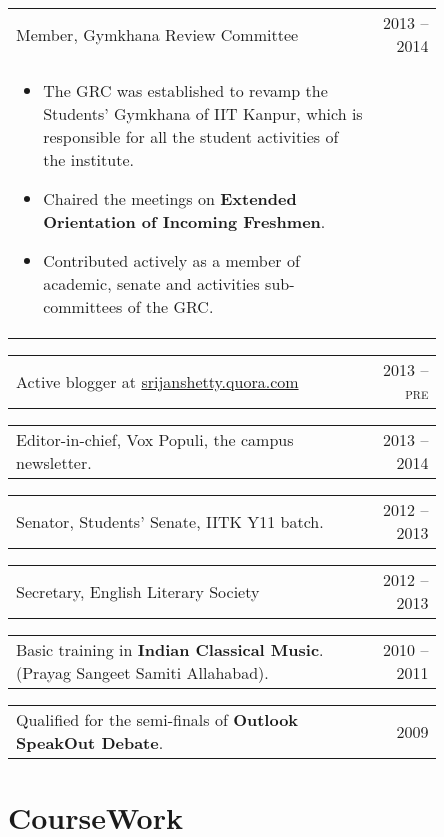 \documentclass[a4paper,10pt]{article} %
\newcommand{\projectlistdated}[3]{
    \begin{tabular}{p{0.85\linewidth}r}
        \textcolor{NavyBlue}{#2} & \multicolumn{1}{m{3cm}}{\raggedleft \textsc{#1}}\\
        \vspace{-0.3cm}
        \footnotesize{#3}
    \end{tabular}
    \vspace{-0.4cm}
}
\newcommand{\skill}[2]{
    \begin{tabular}{p{0.85\linewidth}r}
        #2 & \multicolumn{1}{m{3cm}}{\raggedleft \textsc{#1}}\\
    \end{tabular}
    \vspace{-0.5cm}
}
\begin{document}
\projectlistdated {2013 -- 2014}
                  {Member, Gymkhana Review Committee}
                  {
                       \begin{itemize}[leftmargin=0.5cm]
                           \item The GRC was established to revamp the Students' Gymkhana of IIT Kanpur,
                               which is responsible for all the student activities of the institute.
                           \item Chaired the meetings on \textbf{Extended Orientation of Incoming Freshmen}.
                           \item Contributed actively as a member of academic, senate and activities sub-committees of the GRC.
                       \end{itemize}
                  }

\skill {2013 -- pre}
       {Active blogger at \href{srijanshetty.quora.com} {srijanshetty.quora.com}}

\skill {2013 -- 2014}
       {Editor-in-chief, Vox Populi, the campus newsletter.}

\skill {2012 -- 2013}
       {Senator, Students' Senate, IITK Y11 batch.}

\skill {2012 -- 2013}
       {Secretary, English Literary Society}

\skill {2010 -- 2011}
       {Basic training in \textbf{Indian Classical Music}. (Prayag Sangeet Samiti Allahabad).}

\skill {2009}
       {Qualified for the semi-finals of \textbf{Outlook SpeakOut Debate}.}


\section{CourseWork}
\end{document}
